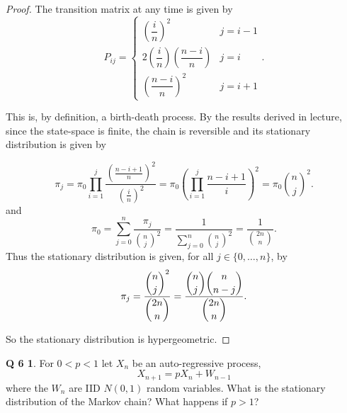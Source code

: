 \documentclass[12pt]{article}
\theoremstyle{definition}
\newtheorem*{prob6}{Q 6}
\begin{document}
\begin{proof}
The transition matrix at any time is given by
$$P_{ij} = \begin{cases}
\left(\dfrac{i}{n}\right)^2 & j = i-1 \\
2\left(\dfrac{i}{n}\right)\left(\dfrac{n-i}{n}\right) & j=i \\
\left(\dfrac{n-i}{n}\right)^2 & j=i+1
\end{cases}.$$

This is, by definition, a birth-death process.  By the results derived in lecture, since the state-space is finite, the chain is reversible and its stationary distribution is given by

$$
\pi_j = \pi_0 \prod_{i=1}^j \frac{\left(\frac{n-i+1}{n}\right)^2}{\left(\frac{i}{n}\right)^2}
= \pi_0 \left(\prod\limits_{i=1}^j \frac{n-i+1}{i} \right)^2 = \pi_0 \binom{n}{j}^2.
$$
and
$$
\pi_0
= \sum\limits_{j=0}^n \frac{\pi_j}{\binom{n}{j}^2}
= \frac{1}{\sum\limits_{j=0}^n \binom{n}{j}^2}
= \frac{1}{\binom{2n}{n}}.
$$
Thus the stationary distribution is given, for all $j \in \{0, \dots, n \}$, by
$$
\pi_j = \dfrac{\dbinom{n}{j}^2}{\dbinom{2n}{n}} = \dfrac{\dbinom{n}{j}\dbinom{n}{n-j}}{\dbinom{2n}{n}}.
$$

\noindent So the stationary distribution is hypergeometric.

\end{proof}

\begin{prob6}
For $0 < p < 1$ let $X_n$ be an auto-regressive process, $$X_{n+1} = pX_n + W_{n-1}$$ where the $W_n$ are IID $N(0,1)$ random variables.  What is the stationary distribution of the Markov chain?  What happens if $p>1$?
\end{prob6}
\end{document}
